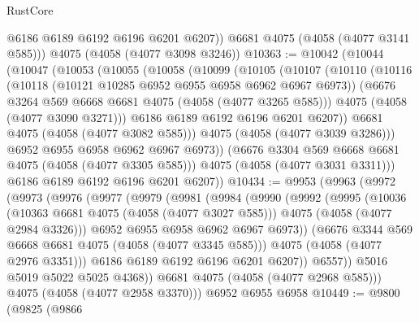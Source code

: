 \begin{lexlean}{RustCore}
\begin{coremodule}
          @6186
          @6189
          @6192
          @6196
          @6201
          @6207))
      @6681
      @4075
      (@4058 (@4077 @3141 @585)))
    @4075
    (@4058 (@4077 @3098 @3246))
@10363 := @10042
    (@10044
      (@10047
        (@10053
          (@10055
            (@10058
              (@10099
                (@10105
                  (@10107
                    (@10110
                      (@10116
                        (@10118 (@10121 @10285 @6952 @6955 @6958 @6962 @6967 @6973))
                        (@6676 @3264 @569 @6668 @6681 @4075 (@4058 (@4077 @3265 @585)))
                        @4075
                        (@4058 (@4077 @3090 @3271)))
                      @6186
                      @6189
                      @6192
                      @6196
                      @6201
                      @6207))
                  @6681
                  @4075
                  (@4058 (@4077 @3082 @585)))
                @4075
                (@4058 (@4077 @3039 @3286)))
              @6952
              @6955
              @6958
              @6962
              @6967
              @6973))
          (@6676 @3304 @569 @6668 @6681 @4075 (@4058 (@4077 @3305 @585)))
          @4075
          (@4058 (@4077 @3031 @3311)))
        @6186
        @6189
        @6192
        @6196
        @6201
        @6207))
@10434 := @9953
    (@9963
      (@9972
        (@9973
          (@9976
            (@9977
              (@9979
                (@9981
                  (@9984
                    (@9990
                      (@9992
                        (@9995
                          (@10036
                            (@10363 @6681 @4075 (@4058 (@4077 @3027 @585)))
                            @4075
                            (@4058 (@4077 @2984 @3326)))
                          @6952
                          @6955
                          @6958
                          @6962
                          @6967
                          @6973))
                      (@6676 @3344 @569 @6668 @6681 @4075 (@4058 (@4077 @3345 @585)))
                      @4075
                      (@4058 (@4077 @2976 @3351)))
                    @6186
                    @6189
                    @6192
                    @6196
                    @6201
                    @6207))
                @6557))
            @5016
            @5019
            @5022
            @5025
            @4368))
        @6681
        @4075
        (@4058 (@4077 @2968 @585)))
      @4075
      (@4058 (@4077 @2958 @3370)))
    @6952
    @6955
    @6958
@10449 := @9800
    (@9825
      (@9866

\end{coremodule}
\end{lexlean}
